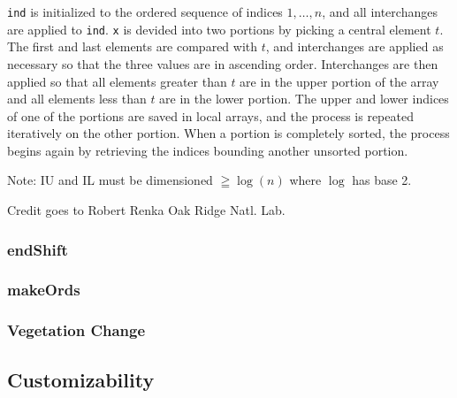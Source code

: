 \texttt{ind} is initialized to the ordered sequence of indices $1,\ldots,n$,
and all interchanges are applied to \texttt{ind}. \texttt{x} is devided
into two portions by picking a central element $t$. The first and
last elements are compared with $t$, and interchanges are applied
as necessary so that the three values are in ascending order. Interchanges
are then applied so that all elements greater than $t$ are in the
upper portion of the array and all elements less than $t$ are in
the lower portion. The upper and lower indices of one of the portions
are saved in local arrays, and the process is repeated iteratively
on the other portion. When a portion is completely sorted, the process
begins again by retrieving the indices bounding another unsorted portion.

Note: IU and IL must be dimensioned $\geqq\log(n)$ where $\log$
has base 2.

Credit goes to Robert Renka Oak Ridge Natl. Lab.

\subsubsection{endShift}



\subsubsection{makeOrds}



\begin{usessubs}
\end{usessubs}

\subsubsection{Vegetation Change}



\subsection{Customizability}